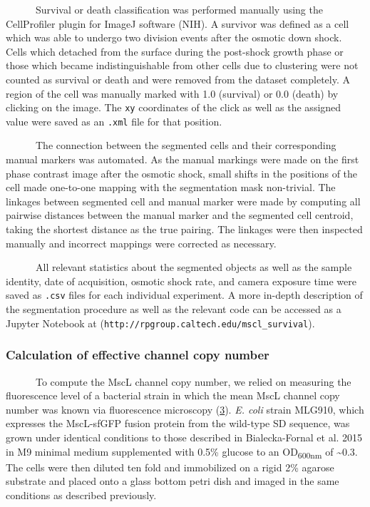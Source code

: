 ~ ~ ~
~Survival
or
death
classification
was
performed
manually
using
the
CellProfiler
plugin
for
ImageJ
software
(NIH).
A
survivor
was
defined
as a
cell
which
was
able
to
undergo
two
division
events
after
the
osmotic
down
shock.
Cells
which
detached
from
the
surface
during
the
post-shock
growth
phase
or
those
which
became
indistinguishable
from
other
cells
due to
clustering
were
not
counted
as
survival
or
death
and
were
removed
from
the
dataset
completely.
A
region
of the
cell
was
manually
marked
with
1.0
(survival)
or 0.0
(death)
by
clicking
on the
image.
The
\texttt{xy}
coordinates
of the
click
as
well
as the
assigned
value
were
saved
as an
\texttt{.xml}
file
for
that
position.

~ ~ ~
~The
connection
between
the
segmented
cells
and
their
corresponding
manual
markers
was
automated.
As the
manual
markings
were
made
on the
first
phase
contrast
image
after
the
osmotic
shock,
small
shifts
in the
positions
of the
cell
made
one-to-one
mapping
with
the
segmentation
mask
non-trivial.
The
linkages
between
segmented
cell
and
manual
marker
were
made
by
computing
all
pairwise
distances
between
the
manual
marker
and
the
segmented
cell
centroid,
taking
the
shortest
distance
as the
true
pairing.
The
linkages
were
then
inspected
manually
and
incorrect
mappings
were
corrected
as
necessary.

~ ~ ~
~All
relevant
statistics
about
the
segmented
objects
as
well
as the
sample
identity,
date
of
acquisition,
osmotic
shock
rate,
and
camera
exposure
time
were
saved
as
\texttt{.csv}
files
for
each
individual
experiment.
A more
in-depth
description
of the
segmentation
procedure
as
well
as the
relevant
code
can be
accessed
as a
Jupyter
Notebook
at
(\texttt{http://rpgroup.caltech.edu/mscl\_survival}).

\subsubsection{Calculation
of
effective
channel
copy
number}\label{calculation-of-effective-channel-copy-number}

~ ~ ~
~To
compute
the
MscL
channel
copy
number,
we
relied
on
measuring
the
fluorescence
level
of a
bacterial
strain
in
which
the
mean
MscL
channel
copy
number
was
known
via
fluorescence
microscopy
(\protect\hyperlink{ref-bialecka-fornal2012}{3}).
\emph{E.
coli}
strain
MLG910,
which
expresses
the
MscL-sfGFP
fusion
protein
from
the
wild-type
SD
sequence,
was
grown
under
identical
conditions
to
those
described
in
Bialecka-Fornal
et al.
2015
in M9
minimal
medium
supplemented
with
0.5\%
glucose
to an
OD\textsubscript{600nm}
of
\textasciitilde{}0.3.
The
cells
were
then
diluted
ten
fold
and
immobilized
on a
rigid
2\%
agarose
substrate
and
placed
onto a
glass
bottom
petri
dish
and
imaged
in the
same
conditions
as
described
previously.

